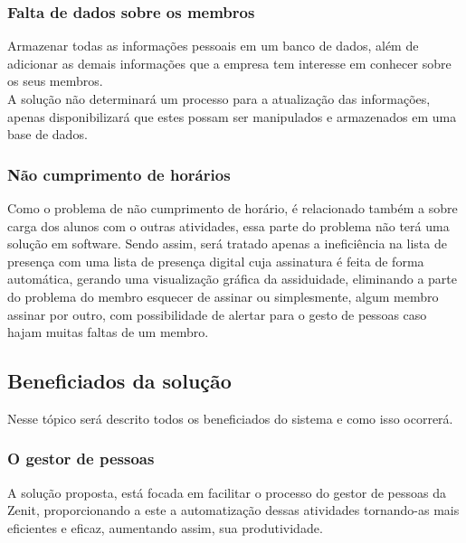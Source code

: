 \begin{anexosenv}
\subsubsection[Falta de dados sobre os membros]{Falta de dados sobre os membros}

Armazenar todas as informações pessoais em um banco de dados, além de adicionar as demais informações que a empresa tem interesse em conhecer sobre os seus membros.\\
A solução não determinará um processo para a atualização das informações, apenas disponibilizará que estes possam ser manipulados e armazenados em uma base de dados.\\

\subsubsection[Não cumprimento de horários]{Não cumprimento de horários}

Como o problema de não cumprimento de horário, é relacionado também a sobre carga dos alunos com o outras atividades, essa parte do problema não terá uma solução em software. Sendo assim, será tratado apenas a ineficiência na lista de presença com uma lista de presença digital cuja assinatura é feita de forma automática, gerando uma visualização gráfica da assiduidade, eliminando a parte do problema do membro esquecer de assinar ou simplesmente, algum membro assinar por outro, com possibilidade de alertar para o gesto de pessoas caso hajam muitas faltas de um membro.\\

\subsection[Beneficiados da solução]{Beneficiados da solução}

Nesse tópico será descrito todos os beneficiados do sistema e como isso ocorrerá.\\


\subsubsection[O gestor de pessoas]{O gestor de pessoas}

A solução proposta, está focada em facilitar o processo do gestor de pessoas da Zenit, proporcionando a este a automatização dessas atividades tornando-as mais eficientes e eficaz, aumentando assim, sua produtividade.\\


\end{anexosenv}

